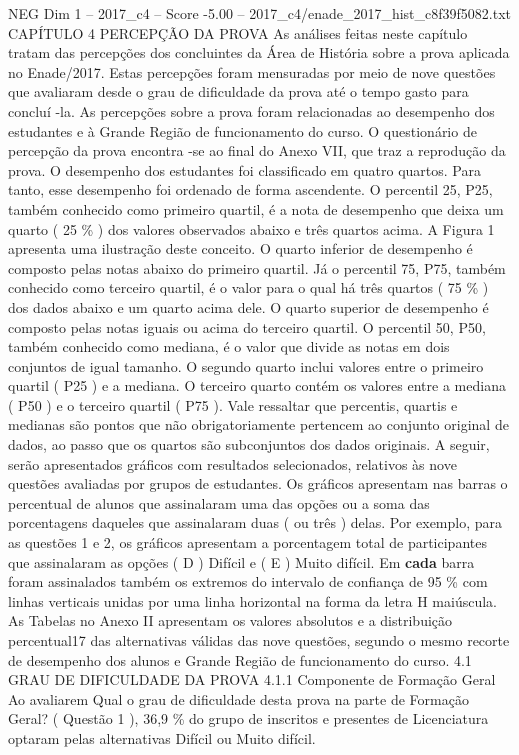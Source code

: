 \begin{textsample}{NEG Dim 1 – 2017\_c4 – Score -5.00 – 2017\_c4/enade\_2017\_hist\_c8f39f5082.txt}  \label{ex:f1_neg_161}
CAPÍTULO 4 PERCEPÇÃO DA PROVA As análises feitas neste capítulo tratam das percepções dos concluintes da Área de História sobre a prova aplicada no Enade/2017.
Estas percepções foram mensuradas por meio de nove questões que avaliaram desde o grau de dificuldade da prova até o tempo gasto para concluí -la.
As percepções sobre a prova foram relacionadas ao desempenho dos estudantes e à Grande Região de funcionamento do curso.
O questionário de percepção da prova encontra -se ao final do Anexo VII, que traz a reprodução da prova.
O desempenho dos estudantes foi classificado em quatro quartos.
Para tanto, esse desempenho foi ordenado de forma ascendente.
O percentil 25, P25, também conhecido como primeiro quartil, é a nota de desempenho que deixa um quarto ( 25 \% ) dos valores observados abaixo e três quartos acima.
A Figura 1 apresenta uma ilustração deste conceito.
O quarto inferior de desempenho é composto pelas notas abaixo do primeiro quartil.
Já o percentil 75, P75, também conhecido como terceiro quartil, é o valor para o qual há três quartos ( 75 \% ) dos dados abaixo e um quarto acima dele.
O quarto superior de desempenho é composto pelas notas iguais ou acima do terceiro quartil.
O percentil 50, P50, também conhecido como mediana, é o valor que divide as notas em dois conjuntos de igual tamanho.
O segundo quarto inclui valores entre o primeiro quartil ( P25 ) e a mediana.
O terceiro quarto contém os valores entre a mediana ( P50 ) e o terceiro quartil ( P75 ).
Vale ressaltar que percentis, quartis e medianas são pontos que não obrigatoriamente pertencem ao conjunto original de dados, ao passo que os quartos são subconjuntos dos dados originais.
A seguir, serão apresentados gráficos com resultados selecionados, relativos às nove questões avaliadas por grupos de estudantes.
Os gráficos apresentam nas barras o percentual de alunos que assinalaram uma das opções ou a soma das porcentagens daqueles que assinalaram duas ( ou três ) delas.
Por exemplo, para as questões 1 e 2, os gráficos apresentam a porcentagem total de participantes que assinalaram as opções ( D ) Difícil e ( E ) Muito difícil.
Em \textbf{cada} barra foram assinalados também os extremos do intervalo de confiança de 95 \% com linhas verticais unidas por uma linha horizontal na forma da letra H maiúscula.
As Tabelas no Anexo II apresentam os valores absolutos e a distribuição percentual17 das alternativas válidas das nove questões, segundo o mesmo recorte de desempenho dos alunos e Grande Região de funcionamento do curso. 4.1 GRAU DE DIFICULDADE DA PROVA 4.1.1 Componente de Formação Geral Ao avaliarem Qual o grau de dificuldade desta prova na parte de Formação Geral? ( Questão 1 ), 36,9 \% do grupo de inscritos e presentes de Licenciatura optaram pelas alternativas Difícil ou Muito difícil.

\end{textsample}
